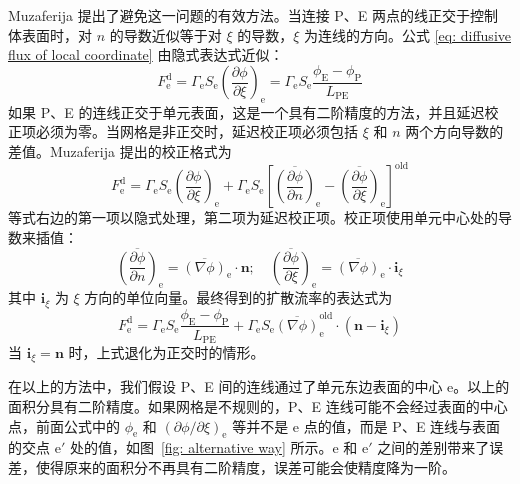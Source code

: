Muzaferija\cite{Muzaferija1994} 提出了避免这一问题的有效方法。当连接 P、E 两点的线正交于控制体表面时，对 $n$ 的导数近似等于对 $\xi$ 的导数，$\xi$ 为连线的方向。公式 \eqref{eq: diffusive flux of local coordinate} 由隐式表达式近似：
\begin{equation}
	F_{\mathrm{e}}^{\mathrm{d}} = \varGamma_{\mathrm{e}}S_{\mathrm{e}}\left(\frac{\partial\phi}{\partial\xi}\right)_{\mathrm{e}} = 
	\varGamma_{\mathrm{e}}S_{\mathrm{e}}\frac{\phi_{\mathrm{E}}-\phi_{\mathrm{P}}}{L_{\mathrm{PE}}}
\end{equation}
如果 P、E 的连线正交于单元表面，这是一个具有二阶精度的方法，并且延迟校正项必须为零。当网格是非正交时，延迟校正项必须包括 $\xi$ 和 $n$ 两个方向导数的差值。Muzaferija\cite{Muzaferija1994} 提出的校正格式为%
\begin{equation}\label{eq: Muzaferija1994 formula}
	F_{\mathrm{e}}^{\mathrm{d}} = \varGamma_{\mathrm{e}}S_{\mathrm{e}}\left(\frac{\partial\phi}{\partial\xi}\right)_{\mathrm{e}} +
	\varGamma_{\mathrm{e}}S_{\mathrm{e}}\left[ 
	\overline{\left(\frac{\partial\phi}{\partial n}\right)}_{\mathrm{e}} - 
	\overline{\left(\frac{\partial\phi}{\partial\xi}\right)}_{\mathrm{e}} \right]^{\mathrm{old}}
\end{equation}
等式右边的第一项以隐式处理，第二项为延迟校正项。校正项使用单元中心处的导数来插值：
\begin{equation}
	\overline{\left(\frac{\partial\phi}{\partial n}\right)}_{\mathrm{e}} =
	\overline{(\nabla\phi)}_{\mathrm{e}}\cdot\bm{n}; \quad
	\overline{\left(\frac{\partial\phi}{\partial\xi}\right)}_{\mathrm{e}} =
	\overline{(\nabla\phi)}_{\mathrm{e}}\cdot\bm{i}_{\xi}
\end{equation}
其中 $\bm{i}_{\xi}$ 为 $\xi$ 方向的单位向量。最终得到的扩散流率的表达式为
\begin{equation}
	F_{\mathrm{e}}^{\mathrm{d}} = \varGamma_{\mathrm{e}}S_{\mathrm{e}}\frac{\phi_{\mathrm{E}}-\phi_{\mathrm{P}}}{L_{\mathrm{PE}}} +
	\varGamma_{\mathrm{e}}S_{\mathrm{e}}\overline{(\nabla\phi)}_{\mathrm{e}}^{\mathrm{old}}\cdot(\bm{n}-\bm{i}_{\xi})
\end{equation}
当 $\bm{i}_{\xi}=\bm{n}$ 时，上式退化为正交时的情形。

在以上的方法中，我们假设 P、E 间的连线通过了单元东边表面的中心 e。以上的面积分具有二阶精度。如果网格是不规则的，P、E 连线可能不会经过表面的中心点，前面公式中的 $\phi_{\mathrm{e}}$ 和 $(\partial\phi/\partial\xi)_{\mathrm{e}}$ 等并不是 e 点的值，而是 P、E 连线与表面的交点 $\mathrm{e}'$ 处的值，如图~\ref{fig: alternative way} 所示。e 和 $\mathrm{e}'$ 之间的差别带来了误差，使得原来的面积分不再具有二阶精度，误差可能会使精度降为一阶。

